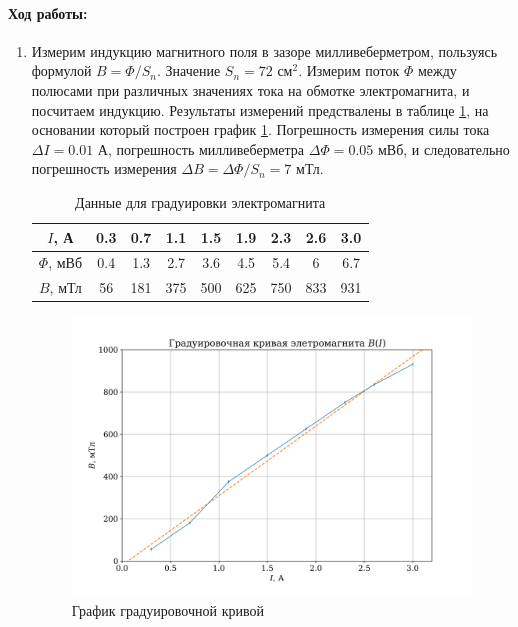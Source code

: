 \documentclass[a4paper,12pt]{article}
\begin{document}
\paragraph{Ход работы:}
\begin{enumerate}
\itemsep0em
\item Измерим индукцию магнитного поля в зазоре милливеберметром, пользуясь 
формулой $B = \Phi / S_n$. Значение $S_n = 72$ см$^2$. Измерим поток $\Phi$ между полюсами
при различных значениях тока на обмотке электромагнита, и посчитаем индукцию. Результаты измерений предствалены в таблице \ref{tab:grad}, на основании который построен график \ref{fig:grad_plot}. Погрешность измерения силы тока $\Delta I = 0.01$ А, погрешность милливеберметра $\Delta \Phi = 0.05$ мВб, и следовательно погрешность измерения $\Delta B = \Delta \Phi / S_n = 7$ мТл.

\begin{table}[h]
\begin{center}
\begin{tabular}{|c|c|c|c|c|c|c|c|c|}
\hline 
$I$, А & 0.3 & 0.7 & 1.1 & 1.5 & 1.9 & 2.3 & 2.6 & 3.0 \\ 
\hline 
$\Phi$, мВб & 0.4 & 1.3 & 2.7 & 3.6 & 4.5 & 5.4 & 6 & 6.7 \\ 
\hline 
$B$, мТл & 56 & 181 & 375 & 500 & 625 & 750 & 833 & 931 \\ 
\hline 
\end{tabular}
\caption{Данные для градуировки электромагнита} 
\label{tab:grad}
\end{center}
\end{table}

\begin{figure}[h!]
\begin{center}
\includegraphics[width=0.85\linewidth]{grad_plot.png}
\caption{График градуировочной кривой}
\label{fig:grad_plot}
\end{center}
\end{figure}



\end{enumerate}
\end{document}
